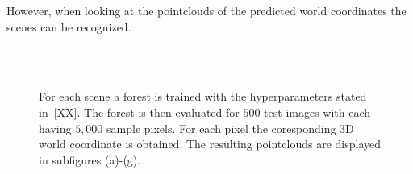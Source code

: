 \documentclass[final]{cvpr}
\begin{document}
However, when looking at the pointclouds of the predicted world coordinates the scenes can be recognized. 

\begin{figure}[ht!]
	\begin{center}
	
	\,
	\,
	\,
	\\
	\,
	\,
	\end{center}
	\caption{For each scene a forest is trained with the hyperparameters stated in~\ref{XX}. The forest 
	is then evaluated for $500$ test images with each having $5,000$ sample pixels. For each pixel the coresponding
	3D world coordinate is obtained. The resulting pointclouds are displayed in subfigures (a)-(g). }
	\label{fig:pointclouds}
	\label{fig:onecol}
\end{figure}
	
\end{document}
